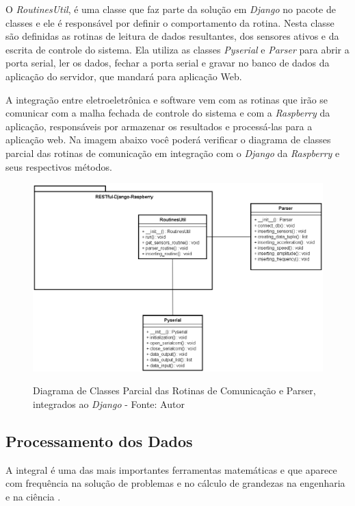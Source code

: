 O \textit{RoutinesUtil}, é uma classe que faz parte da solução em \textit{Django} no pacote de classes e ele é responsável por definir o comportamento da rotina. Nesta classe são definidas as rotinas de leitura de dados resultantes, dos sensores ativos e da escrita de controle do sistema. Ela utiliza as classes \textit{Pyserial} e \textit{Parser} para abrir a porta serial, ler os dados, fechar a porta serial e gravar no banco de dados da aplicação do servidor, que mandará para aplicação Web.

A integração entre eletroeletrônica e software vem com as rotinas que irão se comunicar com a malha fechada de controle do sistema e com a \textit{Raspberry} da aplicação, responsáveis por armazenar os resultados e processá-las para a aplicação web. Na imagem abaixo você poderá verificar o diagrama de classes parcial das rotinas de comunicação em integração com o \textit{Django} da \textit{Raspberry} e seus respectivos métodos.

\begin{figure}[H]
\centering
\includegraphics[keepaspectratio=true,scale=0.65]{figuras/uml_routines_parser.png}
\label{fig:uml_routines_parser}
\caption{Diagrama de Classes Parcial das Rotinas de Comunicação e Parser, integrados ao \textit{Django} - Fonte: Autor}
\end{figure}

\subsection*{\textbf{Processamento dos Dados}}

A integral é uma das mais importantes ferramentas matemáticas e que aparece com frequência na solução de problemas e no cálculo de grandezas na engenharia e na ciência \cite{metodos_numericos}.

